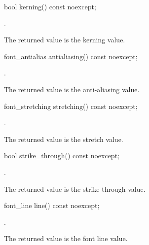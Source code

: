 %
\begin{itemdecl}
bool kerning() const noexcept;
\end{itemdecl}
\begin{itemdescr}
\pnum
\returns {}.

\pnum
\remarks
The returned value is the kerning value.
\end{itemdescr}

%
\begin{itemdecl}
font_antialias antialiasing() const noexcept;
\end{itemdecl}
\begin{itemdescr}
\pnum
\returns {}.

\pnum
\remarks
The returned value is the anti-aliasing value.
\end{itemdescr}

%
\begin{itemdecl}
font_stretching stretching() const noexcept;
\end{itemdecl}
\begin{itemdescr}
\pnum
\returns {}.

\pnum
\remarks
The returned value is the stretch value.
\end{itemdescr}

%
\begin{itemdecl}
bool strike_through() const noexcept;
\end{itemdecl}
\begin{itemdescr}
\pnum
\returns {}.

\pnum
\remarks
The returned value is the strike through value.
\end{itemdescr}

%
\begin{itemdecl}
font_line line() const noexcept;
\end{itemdecl}
\begin{itemdescr}
\pnum
\returns {}.

\pnum
\remarks
The returned value is the font line value.
\end{itemdescr}
